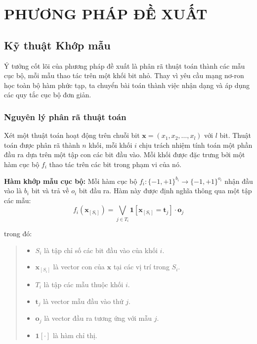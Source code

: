 \chapter{PHƯƠNG PHÁP ĐỀ XUẤT}

\section{Kỹ thuật Khớp mẫu}

Ý tưởng cốt lõi của phương pháp đề xuất là phân rã thuật toán thành các mẫu cục bộ, mỗi mẫu thao tác trên một khối bit nhỏ. Thay vì yêu cầu mạng nơ-ron học toàn bộ hàm phức tạp, ta chuyển bài toán thành việc nhận dạng và áp dụng các quy tắc cục bộ đơn giản.

\subsection{Nguyên lý phân rã thuật toán}

Xét một thuật toán hoạt động trên chuỗi bit $\mathbf{x} = (x_1, x_2, \ldots, x_l)$ với $l$ bit. Thuật toán được phân rã thành $n$ khối, mỗi khối $i$ chịu trách nhiệm tính toán một phần đầu ra dựa trên một tập con các bit đầu vào. Mỗi khối được đặc trưng bởi một hàm cục bộ $f_i$ thao tác trên các bit trong phạm vi của nó.

\vspace{0.2cm}

\textbf{Hàm khớp mẫu cục bộ:} Mỗi hàm cục bộ $f_i: \{-1, +1\}^{b_i} \rightarrow \{-1, +1\}^{o_i}$ nhận đầu vào là $b_i$ bit và trả về $o_i$ bit đầu ra. Hàm này được định nghĩa thông qua một tập các mẫu:
\begin{equation}
    f_i(\mathbf{x}_{[S_i]}) = \bigvee_{j \in T_i} \mathbf{1}[\mathbf{x}_{[S_i]} = \mathbf{t}_j] \cdot \mathbf{o}_j
\end{equation}

trong đó:
\begin{quote}
\begin{itemize}
    \item $S_i$ là tập chỉ số các bit đầu vào của khối $i$.
    \item $\mathbf{x}_{[S_i]}$ là vector con của $\mathbf{x}$ tại các vị trí trong $S_i$.
    \item $T_i$ là tập các mẫu thuộc khối $i$.
    \item $\mathbf{t}_j$ là vector mẫu đầu vào thứ $j$.
    \item $\mathbf{o}_j$ là vector đầu ra tương ứng với mẫu $j$.
    \item $\mathbf{1}[\cdot]$ là hàm chỉ thị.
\end{itemize}
\end{quote}

